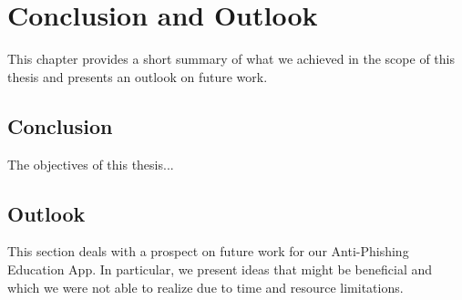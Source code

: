 \section{Conclusion and Outlook}
\label{s:conclusion}

This chapter provides a short summary of what we achieved in the scope of this thesis and presents an outlook on future work.


\subsection{Conclusion}

The objectives of this thesis... 

\subsection{Outlook}
This section deals with a prospect on future work for our Anti-Phishing Education App. In particular, we present ideas that might be beneficial and which we were not able to realize due to time and resource limitations.